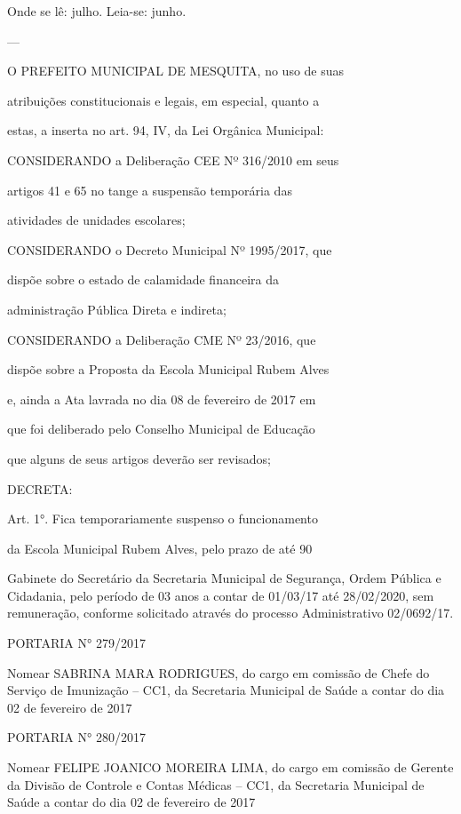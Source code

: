 \documentclass{doliberto}
\begin{document}
Onde se lê: julho. 
Leia-se: junho.

---

O  PREFEITO  MUNICIPAL  DE  MESQUITA,  no  uso  de  suas 

atribuições  constitucionais  e  legais,  em  especial,  quanto  a 

estas, a inserta no art. 94, IV, da Lei Orgânica Municipal: 


CONSIDERANDO a Deliberação CEE Nº 316/2010 em seus 

artigos  41  e  65  no  tange  a  suspensão  temporária  das 

atividades de unidades escolares; 
 

CONSIDERANDO  o  Decreto  Municipal  Nº  1995/2017,  que 

dispõe  sobre  o  estado  de  calamidade  financeira  da 

administração Pública Direta e indireta; 

 

CONSIDERANDO  a  Deliberação  CME  Nº  23/2016,  que 

dispõe sobre a  Proposta  da  Escola Municipal Rubem Alves 

e,  ainda  a  Ata  lavrada  no  dia  08  de  fevereiro  de  2017  em 

que  foi  deliberado  pelo  Conselho  Municipal  de  Educação 

que alguns de seus artigos deverão ser revisados;  

 

DECRETA:  

 

Art.  1°.  Fica  temporariamente  suspenso  o  funcionamento 

da  Escola  Municipal  Rubem  Alves,  pelo  prazo  de  até  90 

Gabinete  do  Secretário  da  Secretaria  Municipal  de 
Segurança, Ordem Pública e Cidadania, pelo período de  03 
anos  a  contar  de  01/03/17  até  28/02/2020,  sem 
remuneração,  conforme  solicitado  através  do  processo 
Administrativo 02/0692/17. 
 
PORTARIA N° 279/2017 

Nomear SABRINA MARA RODRIGUES, do cargo em 
comissão de Chefe do Serviço de Imunização – CC1, da 
Secretaria Municipal de Saúde a contar do dia 02 de 
fevereiro de 2017 

PORTARIA N° 280/2017 

Nomear FELIPE JOANICO MOREIRA LIMA, do cargo em 
comissão de Gerente da Divisão de Controle e Contas 
Médicas – CC1, da Secretaria Municipal de Saúde a 
contar do dia 02 de fevereiro de 2017 
\end{document}
